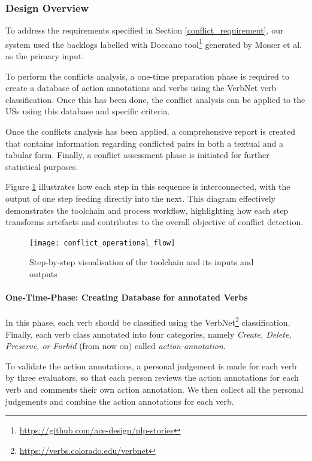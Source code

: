 \subsubsection*{Design Overview}
To address the requirements specified in Section \ref{conflict_requirement}, our system used the backlogs labelled with Doccano tool\footnote{\href{https://github.com/ace-design/nlp-stories}{https://github.com/ace-design/nlp-stories}} generated by Mosser et al. as the primary input\cite{arulmohan2023extracting}.

To perform the conflicts analysis, a one-time preparation phase is required to create a database of action annotations and verbs using the VerbNet verb classification. Once this has been done, the conflict analysis can be applied to the USs using this database and specific criteria.

Once the conflicts analysis has been applied, a comprehensive report is created that contains information regarding conflicted pairs in both a textual and a tabular form. Finally, a conflict assessment phase is initiated for further statistical purposes.

Figure \ref{fig:conflict_operational_flow} illustrates how each step in this sequence is interconnected, with the output of one step feeding directly into the next. This diagram effectively demonstrates the toolchain and process workflow, highlighting how each step transforms artefacts and contributes to the overall objective of conflict detection.
\begin{figure}[h]
	\centering 
	\texttt{[image: conflict\_operational\_flow]}
	\caption{Step-by-step visualisation of the toolchain and its inputs and outputs}\label{fig:conflict_operational_flow}
\end{figure}
\paragraph{One-Time-Phase: Creating Database for annotated Verbs}In this phase, each verb should be classified using the VerbNet\footnote{\href{https://verbs.colorado.edu/verbnet}{https://verbs.colorado.edu/verbnet}} classification. Finally, each verb class annotated into four categories, namely \textit{Create, Delete, Preserve, or Forbid} (from now on) called \textit{action-annotation}. 

To validate the action annotations, a personal judgement is made for each verb by three evaluators, so that each person reviews the action annotations for each verb and comments their own action annotation. We then collect all the personal judgements and combine the action annotations for each verb.

